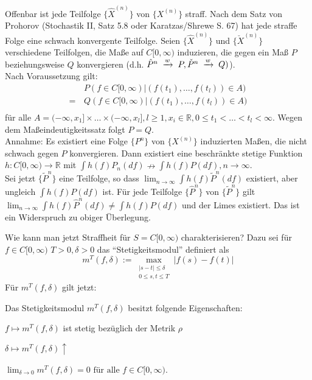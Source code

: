 \documentclass[a4paper,twoside,DIV15,BCOR12mm]{scrbook}
\begin{document}
\begin{beweis}
  Offenbar ist jede Teilfolge $\{\hat{X}^{(n)}\}$ von $\{X^{(n)}\}$ straff. Nach dem Satz von Prohorov (Stochastik II, Satz 5.8 oder Karatzas/Shrewe S. 67) hat jede straffe Folge eine schwach konvergente Teilfolge. Seien $\{\hat{X}^{(n)}\}$ und $\{\check{X}^{(n)}\}$ verschiedene Teilfolgen, die Maße auf $C[0,\infty)$ induzieren, die gegen ein Maß $P$ beziehungsweise $Q$ konvergieren (d.h. $\hat P^n\tomit{w}P,\check P^n\tomit{w}Q)$). \\
Nach Voraussetzung gilt:
\begin{align*}
 & \, P(f\in C[0,\infty) \vert (f(t_1),\dots,f(t_l))\in A) \\
=& \, Q(f\in C[0,\infty) \vert (f(t_1),\dots,f(t_l))\in A) \\
\end{align*}
für alle $A=(-\infty,x_1]\times\dots\times(-\infty,x_l],l\geq1,x_i\in\mathbb R, 0\leq t_1 <\dots< t_l<\infty$. Wegen dem Maßeindeutigkeitssatz folgt $P=Q$. \\
Annahme: Es existiert eine Folge $\{P^n\}$ von $\{X^{(n)}\}$ induzierten Maßen, die nicht schwach gegen $P$ konvergieren. Dann existiert eine beschränkte stetige Funktion $h:C[0,\infty)\longrightarrow\mathbb R$ mit $\int h(f)P_n(df)\nrightarrow \int h(f)P(df),n\to\infty$. \\
Sei jetzt $\{\tilde P^n\}$ eine Teilfolge, so dass $\lim_{n\to\infty}\int h(f)\tilde P^n(df)$ existiert, aber ungleich $\int h(f)P(df)$ ist. Für jede Teilfolge $\{\hat P^n\}$ von $\{\tilde P^n\}$ gilt $\lim_{n\to\infty}\int h(f)\hat P^n(df)\neq\int h(f)P(df)$ und der Limes existiert. Das ist ein Widerspruch zu obiger Überlegung.
\end{beweis}
Wie kann man jetzt Straffheit für $S=C[0,\infty)$ charakterisieren? Dazu sei für $f\in C[0,\infty)$ $T>0,\delta>0$ das ``Stetigkeitsmodul'' definiert als
\[
m^T(f,\delta):=\max_{\begin{array}{c} \vert s-t\vert\leq \delta \\ 0\leq s,t\leq T \end{array}}\vert f(s)-f(t)\vert
\]
Für $m^T(f,\delta)$ gilt jetzt:
\begin{lemma}
  \label{lemma:14.4}
Das Stetigkeitsmodul $m^T(f,\delta)$ besitzt folgende Eigenschaften:
\begin{enuma}
\item $f\mapsto m^T(f,\delta)$ ist stetig bezüglich der Metrik $\rho$
\item $\delta\mapsto m^T(f,\delta)\uparrow$
\item $\lim_{\delta\to 0} m^T(f,\delta)=0 \text{ für alle } f\in C[0,\infty)$.
\end{enuma}
\end{lemma}
\end{document}
